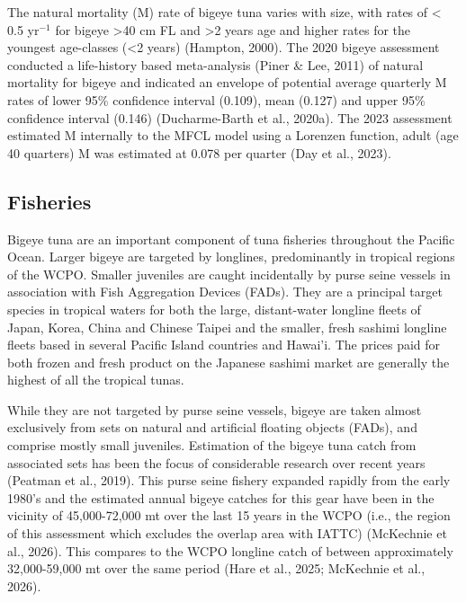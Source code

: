\documentclass[
  english,
  a4paper,
  a4paper,
  11pt]{SCreport}
\begin{document}
The natural mortality (M) rate of bigeye tuna varies with size, with
rates of \textless{} 0.5 yr\(^{-1}\) for bigeye \textgreater40 cm FL and
\textgreater2 years age and higher rates for the youngest age-classes
(\textless2 years) (Hampton, 2000). The 2020 bigeye assessment conducted
a life-history based meta-analysis (Piner \& Lee, 2011) of natural
mortality for bigeye and indicated an envelope of potential average
quarterly M rates of lower 95\% confidence interval (0.109), mean
(0.127) and upper 95\% confidence interval (0.146) (Ducharme-Barth et
al., 2020a). The 2023 assessment estimated M internally to the MFCL
model using a Lorenzen function, adult (age 40 quarters) M was estimated
at 0.078 per quarter (Day et al., 2023).

\subsection{Fisheries}\label{sec-fisheries}

Bigeye tuna are an important component of tuna fisheries throughout the
Pacific Ocean. Larger bigeye are targeted by longlines, predominantly in
tropical regions of the WCPO. Smaller juveniles are caught incidentally
by purse seine vessels in association with Fish Aggregation Devices
(FADs). They are a principal target species in tropical waters for both
the large, distant-water longline fleets of Japan, Korea, China and
Chinese Taipei and the smaller, fresh sashimi longline fleets based in
several Pacific Island countries and Hawai'i. The prices paid for both
frozen and fresh product on the Japanese sashimi market are generally
the highest of all the tropical tunas.

While they are not targeted by purse seine vessels, bigeye are taken
almost exclusively from sets on natural and artificial floating objects
(FADs), and comprise mostly small juveniles. Estimation of the bigeye
tuna catch from associated sets has been the focus of considerable
research over recent years (Peatman et al., 2019). This purse seine
fishery expanded rapidly from the early 1980's and the estimated annual
bigeye catches for this gear have been in the vicinity of 45,000-72,000
mt over the last 15 years in the WCPO (i.e., the region of this
assessment which excludes the overlap area with IATTC) (McKechnie et
al., 2026). This compares to the WCPO longline catch of between
approximately 32,000-59,000 mt over the same period (Hare et al., 2025;
McKechnie et al., 2026).
\end{document}

